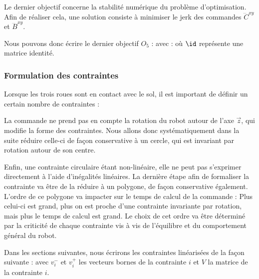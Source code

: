 					Le dernier objectif concerne la stabilité numérique du problème d'optimisation.
					Afin de réaliser cela, une solution consiste à minimiser le jerk des commandes $\dddot{C}^{xy}$ et $\dddot{B}^{xy}$.
					
					Nous pouvons donc écrire le dernier objectif $O_5$ :
					avec : 
					où $\id$ représente une matrice identité.

			\subsubsection{Formulation des contraintes}
			\label{ctr_intro_3_roues}

				Lorsque les trois roues sont en contact avec le sol, il est important de définir un certain nombre de contraintes :
				
				La commande ne prend pas en compte la rotation du robot autour de l'axe $\vec{z}$, qui modifie la forme des contraintes.
				Nous allons donc systématiquement dans la suite réduire celle-ci de façon conservative à un cercle, qui est invariant par rotation autour de son centre.
				
				Enfin, une contrainte circulaire étant non-linéaire, elle ne peut pas s'exprimer directement à l'aide d'inégalités linéaires.
				La dernière étape afin de formaliser la contrainte va être de la réduire à un polygone, de façon conservative également.
				L'ordre de ce polygone va impacter sur le temps de calcul de la commande : Plus celui-ci est grand, plus on est proche d'une contrainte invariante par rotation, mais plus le temps de calcul est grand.
				Le choix de cet ordre va être déterminé par la criticité de chaque contrainte vis à vis de l'équilibre et du comportement général du robot.
				
				
				
				Dans les sections suivantes, nous écrirons les contraintes linéarisées de la façon suivante :
				avec $v^-_i$ et $v^+_i$ les vecteurs bornes de la contrainte $i$ et $V$ la matrice de la contrainte $i$.
				
